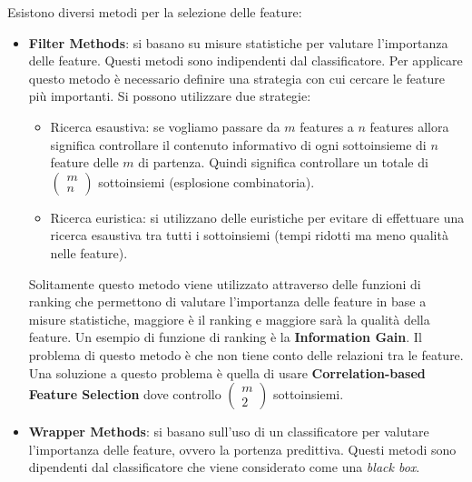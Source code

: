 Esistono diversi metodi per la selezione delle feature:
\begin{itemize}
      \item \textbf{Filter Methods}: si basano su misure statistiche per valutare
            l'importanza delle feature. Questi metodi sono indipendenti dal
            classificatore. Per applicare questo metodo è necessario definire 
            una strategia con cui cercare le feature più importanti. Si possono
            utilizzare due strategie:
            \begin{itemize}
                  \item Ricerca esaustiva: se vogliamo passare da $m$ features a 
                  $n$ features allora significa controllare il contenuto informativo
                  di ogni sottoinsieme di $n$ feature delle $m$ di partenza. Quindi 
                  significa controllare un totale di $\left(\begin{array}{c}
                        m\\n
                  \end{array}\right) $ sottoinsiemi (esplosione combinatoria).
                  \item Ricerca euristica: si utilizzano delle euristiche per 
                  evitare di effettuare una ricerca esaustiva tra tutti i 
                  sottoinsiemi (tempi ridotti ma meno qualità nelle feature).
            \end{itemize}
            Solitamente questo metodo viene utilizzato attraverso delle funzioni 
            di ranking che permettono di valutare l'importanza delle feature in 
            base a misure statistiche, maggiore è il ranking e maggiore sarà 
            la qualità della feature. Un esempio di funzione di ranking è la
            \textbf{Information Gain}.
            Il problema di questo metodo è che non tiene conto delle relazioni tra
            le feature. Una soluzione a questo problema è quella di usare 
            \textbf{Correlation-based Feature Selection} dove controllo $\left(\begin{array}{c}
                  m\\2
            \end{array}\right) $ sottoinsiemi.
      \item \textbf{Wrapper Methods}: si basano sull'uso di un classificatore per
            valutare l'importanza delle feature, ovvero la portenza predittiva.
            Questi metodi sono dipendenti dal
            classificatore che viene considerato come una \textit{black box}.

\end{itemize}
